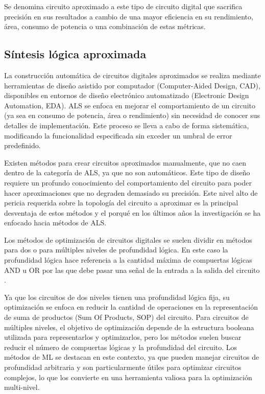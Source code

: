 Se denomina circuito aproximado a este tipo de circuito digital que sacrifica
precisión en sus resultados a cambio de una mayor eficiencia en su rendimiento,
área, consumo de potencia o una combinación de estas métricas.

\subsection{Síntesis lógica aproximada}

La construcción automática de circuitos digitales aproximados se realiza
mediante herramientas de diseño asistido por computador (Computer-Aided Design,
CAD), disponibles en entornos de diseño electrónico automatizado (Electronic
Design Automation, EDA). ALS se enfoca en mejorar el comportamiento de un
circuito (ya sea en consumo de potencia, área o rendimiento) sin necesidad de
conocer sus detalles de implementación. Este proceso se lleva a cabo de forma
sistemática, modificando la funcionalidad especificada sin exceder un umbral de
error predefinido.

Existen métodos para crear circuitos aproximados manualmente, que no caen
dentro de la categoría de ALS, ya que no son automáticos. Este tipo de diseño
requiere un profundo conocimiento del comportamiento del circuito para poder
hacer aproximaciones que no degraden demasiado su precisión. Este nivel alto de
pericia requerida sobre la topología del circuito a aproximar es la principal
desventaja de estos métodos y el porqué en los últimos años la investigación se
ha enfocado hacia métodos de ALS.
\cite{ammes_two-level_2022}

Los métodos de optimización de circuitos digitales se suelen dividir en métodos
para dos o para múltiples niveles de profundidad lógica. En este caso la
profundidad lógica hace referencia a la cantidad máxima de compuertas lógicas
AND u OR por las que debe pasar una señal de la entrada a la salida del
circuito \cite{barr_investigation_1960}.

Ya que los circuitos de dos niveles tienen una profundidad lógica fija, su
optimización se enfoca en reducir la cantidad de operaciones en la
representación de suma de productos (Sum Of Products, SOP) del circuito. Para
circuitos de múltiples niveles, el objetivo de optimización depende de la
estructura booleana utilizada para representarlos y optimizarlos, pero los
métodos suelen buscar reducir el número de compuertas lógicas y la profundidad
del circuito. Los métodos de ML se destacan en este contexto, ya que pueden
manejar circuitos de profundidad arbitraria y son particularmente útiles para
optimizar circuitos complejos, lo que los convierte en una herramienta valiosa
para la optimización multi-nivel. \cite{ammes_two-level_2022}

